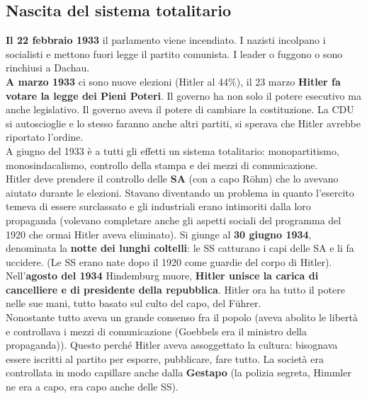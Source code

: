 \subsection{Nascita del sistema totalitario}
\textbf{Il 22 febbraio 1933} il parlamento viene incendiato. I nazisti incolpano i socialisti e 
mettono fuori legge il partito comunista. I leader o fuggono o sono rinchiusi a Dachau.\\
\textbf{A marzo 1933} ci sono nuove elezioni (Hitler al 44\%), il 23 marzo \textbf{Hitler fa votare 
la legge dei Pieni Poteri}. Il governo ha non solo il potere esecutivo ma anche legislativo. Il 
governo aveva il potere di cambiare la costituzione. La CDU si autoscioglie e lo stesso faranno anche
altri partiti, si sperava che Hitler avrebbe riportato l'ordine.\\
A giugno del 1933 è a tutti gli effetti un sistema totalitario: monopartitismo, monosindacalismo,
controllo della stampa e dei mezzi di comunicazione.\\
Hitler deve prendere il controllo delle \textbf{SA} (con a capo Röhm) che lo avevano aiutato durante 
le elezioni. Stavano diventando un problema in quanto l'esercito temeva di essere surclassato e gli
industriali erano intimoriti dalla loro propaganda (volevano completare anche gli aspetti sociali
del programma del 1920 che ormai Hitler aveva eliminato). Si giunge al \textbf{30 giugno 1934},
denominata la \textbf{notte dei lunghi coltelli}: le SS catturano i capi delle SA e li fa uccidere.
(Le SS erano nate dopo il 1920 come guardie del corpo di Hitler).\\
Nell'\textbf{agosto del 1934} Hindemburg muore, \textbf{Hitler unisce la carica di cancelliere e di
presidente della repubblica}. Hitler ora ha tutto il potere nelle sue mani, tutto basato sul culto
del capo, del Führer.\\
Nonostante tutto aveva un grande consenso fra il popolo (aveva abolito le libertà e controllava i
mezzi di comunicazione (Goebbels era il ministro della propaganda)). Questo perché Hitler aveva
assoggettato la cultura: bisognava essere iscritti al partito per esporre, pubblicare, fare tutto.
La società era controllata in modo capillare anche dalla \textbf{Gestapo} (la polizia segreta, 
Himmler ne era a capo, era capo anche delle SS).

